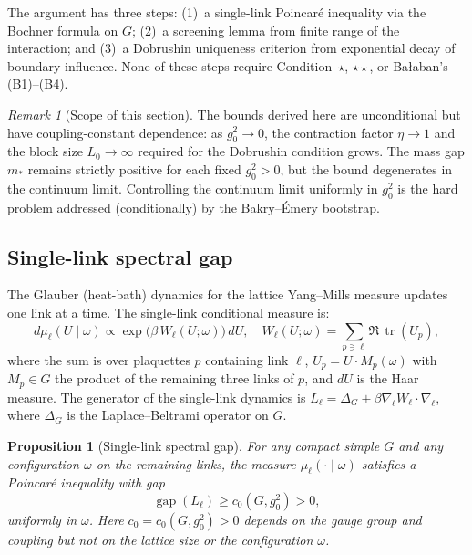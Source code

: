 \documentclass[11pt,a4paper]{article}
\theoremstyle{plain}
\newtheorem{proposition}[theorem]{Proposition}
\theoremstyle{definition}
\theoremstyle{remark}
\newtheorem{remark}[theorem]{Remark}
\newcommand{\tr}{\operatorname{tr}}
\DeclareMathOperator{\gap}{gap}
\begin{document}
The argument has three steps: (1)~a single-link Poincar\'e inequality
via the Bochner formula on $G$; (2)~a screening lemma from finite
range of the interaction; and (3)~a Dobrushin uniqueness criterion
from exponential decay of boundary influence.  None of these steps
require Condition~$\star$, $\star\star$, or Ba\l{}aban's (B1)--(B4).

\begin{remark}[Scope of this section]
The bounds derived here are unconditional but have coupling-constant
dependence: as $g_0^2 \to 0$, the contraction factor $\eta \to 1$
and the block size $L_0 \to \infty$ required for the Dobrushin
condition grows.  The mass gap $m_*$ remains strictly positive
for each fixed $g_0^2 > 0$, but the bound degenerates in the
continuum limit.  Controlling the continuum limit uniformly in
$g_0^2$ is the hard problem addressed (conditionally) by the
Bakry--\'Emery bootstrap.
\end{remark}

\subsection{Single-link spectral gap}

The Glauber (heat-bath) dynamics for the lattice Yang--Mills
measure updates one link at a time.  The single-link conditional
measure is:
\begin{equation}\label{eq:single-link-measure}
  d\mu_\ell(U \mid \omega) \propto
  \exp\!\bigl(\beta\, W_\ell(U;\omega)\bigr)\,dU,
  \quad
  W_\ell(U;\omega) = \sum_{p \ni \ell} \Re\,\tr(U_p),
\end{equation}
where the sum is over plaquettes $p$ containing link $\ell$,
$U_p = U \cdot M_p(\omega)$ with $M_p \in G$ the product of
the remaining three links of $p$, and $dU$ is the Haar measure.
The generator of the single-link dynamics is
$L_\ell = \Delta_G + \beta \nabla_\ell W_\ell \cdot \nabla_\ell$,
where $\Delta_G$ is the Laplace--Beltrami operator on $G$.

\begin{proposition}[Single-link spectral gap]
\label{prop:single-link-gap}
For any compact simple $G$ and any configuration $\omega$
on the remaining links, the measure $\mu_\ell(\cdot \mid \omega)$
satisfies a Poincar\'e inequality with gap
\begin{equation}\label{eq:single-gap}
  \gap(L_\ell) \ge c_0(G, g_0^2) > 0,
\end{equation}
uniformly in $\omega$.  Here $c_0 = c_0(G, g_0^2) > 0$ depends
on the gauge group and coupling but not on the lattice size
or the configuration $\omega$.
\end{proposition}
\end{document}
